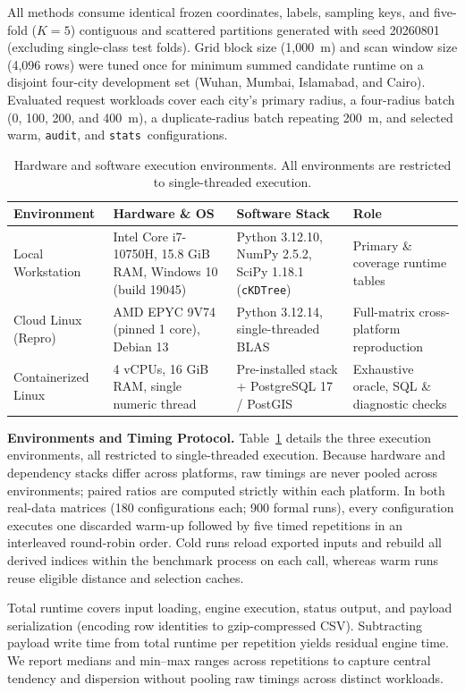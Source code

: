 \documentclass[sigconf, nonacm]{acmart}
\newcommand{\audit}{\texttt{audit}}
\newcommand{\stats}{\texttt{stats}}
\begin{document}
All methods consume identical frozen coordinates, labels, sampling keys, and five-fold ($K=5$) contiguous and scattered partitions generated with seed 20260801 (excluding single-class test folds). Grid block size (1{,}000~m) and scan window size (4{,}096 rows) were tuned once for minimum summed candidate runtime on a disjoint four-city development set (Wuhan, Mumbai, Islamabad, and Cairo). Evaluated request workloads cover each city's primary radius, a four-radius batch (0, 100, 200, and 400~m), a duplicate-radius batch repeating 200~m, and selected warm, \audit, and \stats\ configurations.

\begin{table}[t]
\caption{Hardware and software execution environments. All environments are restricted to single-threaded execution.}
\label{tab:env}\centering\small
\setlength{\tabcolsep}{4pt}
\begin{tabular}{p{2.3cm}p{6.2cm}p{5.0cm}p{3.0cm}}\toprule
Environment & Hardware \& OS & Software Stack & Role\\\midrule
Local Workstation & Intel Core i7-10750H, 15.8 GiB RAM, Windows 10 (build 19045) & Python 3.12.10, NumPy 2.5.2, SciPy 1.18.1 (\texttt{cKDTree}) & Primary \& coverage runtime tables\\
Cloud Linux (Repro) & AMD EPYC 9V74 (pinned 1 core), Debian 13 & Python 3.12.14, single-threaded BLAS & Full-matrix cross-platform reproduction\\
Containerized Linux & 4 vCPUs, 16 GiB RAM, single numeric thread & Pre-installed stack + PostgreSQL 17 / PostGIS & Exhaustive oracle, SQL \& diagnostic checks\\\bottomrule
\end{tabular}
\end{table}

\textbf{Environments and Timing Protocol.} Table~\ref{tab:env} details the three execution environments, all restricted to single-threaded execution. Because hardware and dependency stacks differ across platforms, raw timings are never pooled across environments; paired ratios are computed strictly within each platform. In both real-data matrices (180 configurations each; 900 formal runs), every configuration executes one discarded warm-up followed by five timed repetitions in an interleaved round-robin order. Cold runs reload exported inputs and rebuild all derived indices within the benchmark process on each call, whereas warm runs reuse eligible distance and selection caches.

Total runtime covers input loading, engine execution, status output, and payload serialization (encoding row identities to gzip-compressed CSV). Subtracting payload write time from total runtime per repetition yields residual engine time. We report medians and min--max ranges across repetitions to capture central tendency and dispersion without pooling raw timings across distinct workloads.
\end{document}
